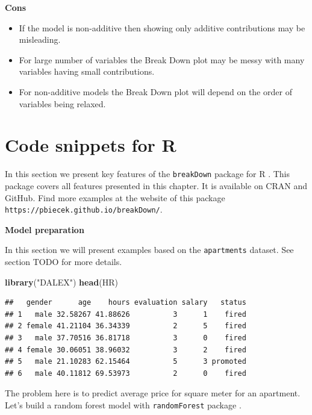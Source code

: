 \documentclass[]{book}
\newenvironment{Shaded}{\begin{snugshade}}{\end{snugshade}}
\newcommand{\KeywordTok}[1]{\textcolor[rgb]{0.13,0.29,0.53}{\textbf{#1}}}
\newcommand{\NormalTok}[1]{#1}
\newcommand{\StringTok}[1]{\textcolor[rgb]{0.31,0.60,0.02}{#1}}
\providecommand{\tightlist}{%
  \setlength{\itemsep}{0pt}\setlength{\parskip}{0pt}}
\theoremstyle{definition}
\theoremstyle{definition}
\theoremstyle{definition}
\theoremstyle{remark}
\begin{document}
\textbf{Cons}

\begin{itemize}
\tightlist
\item
  If the model is non-additive then showing only additive contributions
  may be misleading.
\item
  For large number of variables the Break Down plot may be messy with
  many variables having small contributions.
\item
  For non-additive models the Break Down plot will depend on the order
  of variables being relaxed.
\end{itemize}

\hypertarget{code-snippets-for-r}{%
\section{Code snippets for R}\label{code-snippets-for-r}}

In this section we present key features of the \texttt{breakDown}
package for R \citep{R-breakDown}. This package covers all features
presented in this chapter. It is available on CRAN and GitHub. Find more
examples at the website of this package
\texttt{https://pbiecek.github.io/breakDown/}.

\textbf{Model preparation}

In this section we will present examples based on the
\texttt{apartments} dataset. See section TODO for more details.

\begin{Shaded}
\begin{Highlighting}[]
\KeywordTok{library}\NormalTok{(}\StringTok{"DALEX"}\NormalTok{)}
\KeywordTok{head}\NormalTok{(HR)}
\end{Highlighting}
\end{Shaded}

\begin{verbatim}
##   gender      age    hours evaluation salary   status
## 1   male 32.58267 41.88626          3      1    fired
## 2 female 41.21104 36.34339          2      5    fired
## 3   male 37.70516 36.81718          3      0    fired
## 4 female 30.06051 38.96032          3      2    fired
## 5   male 21.10283 62.15464          5      3 promoted
## 6   male 40.11812 69.53973          2      0    fired
\end{verbatim}

The problem here is to predict average price for square meter for an
apartment. Let's build a random forest model with \texttt{randomForest}
package \citep{R-randomForest}.
\end{document}
